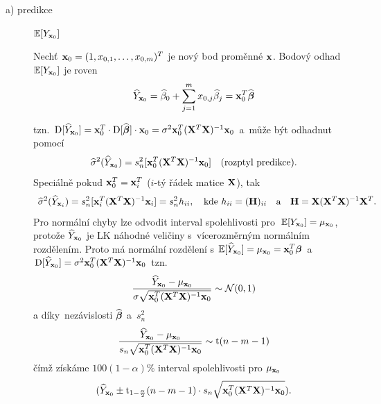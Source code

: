 \begin{description}
	\item[a) predikce] $\mathbb{E} [Y_{\mathbf{x}_0}]$

Nechť $\mathbf{x}_0 = (1, x_{0,1},\dots, x_{0,m})^T$ je nový bod proměnné $\mathbf{x}$. Bodový odhad $\mathbb{E} [Y_{\mathbf{x}_0}]$ je roven
 $$
 \widehat{Y}_{\mathbf{x}_0} = \widehat{\beta}_0 + \sum_{j = 1}^m x_{0,j} \widehat{\beta}_j = \mathbf{x}_0^T \widehat{\boldsymbol{\beta}}
 $$

tzn. $\mathrm{D} [\widehat{Y}_{\mathbf{x}_0}] = \mathbf{x}_0^T \cdot \mathrm{D} [\widehat{\boldsymbol{\beta}}] \cdot \mathbf{x}_0 = \sigma^2 \mathbf{x}_0^T(\mathbf{X}^T \mathbf{X})^{-1} \mathbf{x}_0$ a~může být odhadnut pomocí
 $$
 \widehat{\sigma}^2(\widehat{Y}_{\mathbf{x}_0}) = s_n^2 [\mathbf{x}_0^T(\mathbf{X}^T \mathbf{X})^{-1} \mathbf{x}_0] \quad \text{(rozptyl predikce)}.
 $$
 Speciálně pokud $\mathbf{x}_0^T = \mathbf{x}_i^T$ ($i$-tý řádek matice $\mathbf{X}$), tak
 $$
  \widehat{\sigma}^2(\widehat{Y}_{\mathbf{x}_i}) = s_n^2 [\mathbf{x}_i^T(\mathbf{X}^T \mathbf{X})^{-1} \mathbf{x}_i] = s_n^2 h_{ii}, \quad \text{kde } h_{ii} = (\textbf{H})_{ii} \quad \text{a} \quad \textbf{H} = \mathbf{X} (\mathbf{X}^T  \mathbf{X})^{-1} \mathbf{X}^T.
 $$
Pro normální chyby lze odvodit interval spolehlivosti pro~$\mathbb{E} [Y_{\mathbf{x}_0}] = \mu_{\mathbf{x}_0}$, protože $\widehat{Y}_{\mathbf{x}_0}$ je LK náhodné veličiny s~vícerozměrným normálním rozdělením. Proto má normální rozdělení s $\mathbb{E} [\widehat{Y}_{\mathbf{x}_0}] = \mu_{\mathbf{x}_0} = \mathbf{x}_0^T \boldsymbol{\beta}$ a~$\mathrm{D} [\widehat{Y}_{\mathbf{x}_0}] = \sigma^2 \mathbf{x}_0^T(\mathbf{X}^T \mathbf{X})^{-1} \mathbf{x}_0$
tzn.
 $$
\frac{\widehat{Y}_{\mathbf{x}_0} - \mu_{\mathbf{x}_0}}{\sigma \sqrt{\mathbf{x}_0^T(\mathbf{X}^T \mathbf{X})^{-1} \mathbf{x}_0}} \sim \mathcal{N}(0,1)
 $$
a díky~nezávislosti $\widehat{\boldsymbol{\beta}}$ a~$s_n^2$
 $$
 \frac{\widehat{Y}_{\mathbf{x}_0} - \mu_{\mathbf{x}_0}}{s_n \sqrt{\mathbf{x}_0^T(\mathbf{X}^T \mathbf{X})^{-1} \mathbf{x}_0}} \sim \mathrm{t}(n-m-1)
 $$
 čímž získáme $100(1-\alpha)\%$ interval spolehlivosti pro $\mu_{\mathbf{x}_0}$
 $$
   (\widehat{Y}_{\mathbf{x}_0} \pm \mathrm{t}_{1-\frac{\alpha}{2}}(n-m-1) \cdot s_n \sqrt{\mathbf{x}_0^T(\mathbf{X}^T \mathbf{X})^{-1} \mathbf{x}_0}).
 $$
	\begin{figure}[h]
	\centering
\end{figure}
\end{description}
